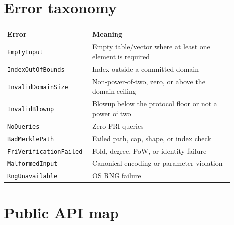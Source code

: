 \documentclass[11pt,a4paper]{article}
\begin{document}
\appendix

\section{Error taxonomy}

\begin{longtable}{@{}L{0.30\linewidth}L{0.60\linewidth}@{}}
\toprule
Error & Meaning \\
\midrule
\endhead
\texttt{EmptyInput} & Empty table/vector where at least one element is required \\
\texttt{IndexOutOfBounds} & Index outside a committed domain \\
\texttt{InvalidDomainSize} & Non-power-of-two, zero, or above the domain ceiling \\
\texttt{InvalidBlowup} & Blowup below the protocol floor or not a power of two \\
\texttt{NoQueries} & Zero FRI queries \\
\texttt{BadMerklePath} & Failed path, cap, shape, or index check \\
\texttt{FriVerificationFailed} & Fold, degree, PoW, or identity failure \\
\texttt{MalformedInput} & Canonical encoding or parameter violation \\
\texttt{RngUnavailable} & OS RNG failure \\
\bottomrule
\end{longtable}

\section{Public API map}
\end{document}
